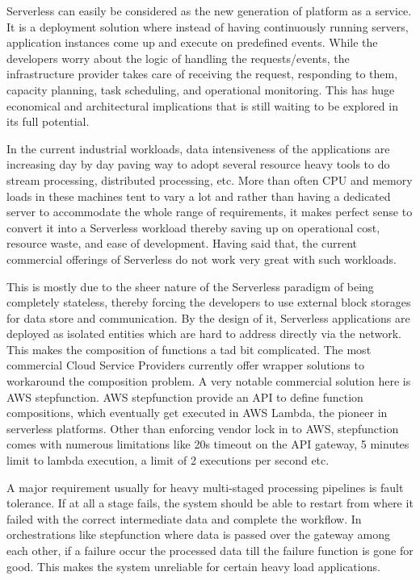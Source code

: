 \documentclass[12pt,titlepage]{article}
\begin{document}
Serverless can easily be considered as the new generation of platform as a
service. It is a deployment solution where instead of having continuously
running servers, application instances come up and execute on predefined events.
While the developers worry about
the logic of handling the requests/events, the infrastructure provider takes
care of receiving the request, responding to them, capacity planning, task
scheduling, and operational monitoring\cite{gotoconf}.
This has huge economical and architectural implications that is
still waiting to be explored in its full potential. 

In the current industrial workloads, data intensiveness of the applications are increasing
day by day paving way to adopt several resource heavy tools to do stream
processing, distributed processing, etc. More than often CPU and memory loads in
these machines tent to vary a lot and rather than having a dedicated server to accommodate the whole range
of requirements, it makes perfect sense to convert it into a Serverless workload
thereby saving up on operational cost, resource waste, and ease of development.
Having said that, the current commercial offerings of Serverless do not work
very great with such workloads.

This is mostly due to the sheer
nature of the Serverless paradigm of being completely stateless, thereby forcing
the developers to use external block storages for data store and communication.
By the design of it, Serverless applications are deployed as isolated entities
which are hard to address directly via the network. This makes the composition
of functions a tad bit complicated. The most commercial Cloud Service Providers
currently offer wrapper solutions to workaround the composition problem. A very
notable commercial solution here is AWS stepfunction. AWS stepfunction provide
an API to define function compositions, which eventually get executed in AWS
Lambda, the pioneer in serverless platforms. Other than enforcing vendor lock in
to AWS, stepfunction comes with numerous limitations like 20s timeout on the API
gateway, 5 minutes limit to lambda execution, a limit of 2 executions per second
etc.

A major requirement usually for heavy multi-staged processing pipelines is fault
tolerance. If at all a stage fails, the system should be able to restart from
where it failed with the correct intermediate data and complete the workflow. In
orchestrations like stepfunction where data is passed over the gateway among
each other, if a failure occur the processed data till the failure function is
gone for good. This makes the system unreliable for certain heavy load applications.
\end{document}
